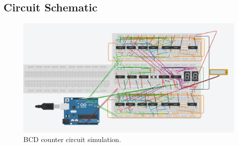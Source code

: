 \documentclass{article}
\begin{document}
    \subsection{Circuit Schematic}
    \begin{figure}[H]
        \centering
        \includegraphics[width=\textwidth]{counter_circuit.jpeg}
        \caption{BCD counter circuit simulation.}
	\label{fig(a):bcd_counter_simulating}
    \end{figure}
\end{document}
